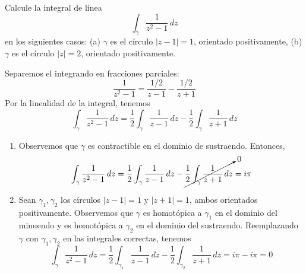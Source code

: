 \begin{exercise}
Calcule la integral de línea
$$\int_\gamma \frac 1 {z^2 - 1} \, dz$$
en los siguientes casos: (a) $\gamma$ es el círculo $|z - 1| = 1$, orientado positivamente, (b) $\gamma$ es el círculo $|z| = 2$, orientado positivamente.
\end{exercise}

\begin{solution}
Separemos el integrando en fracciones parciales:
$$\frac 1 {z^2 - 1} = \frac {1/2} {z-1} - \frac {1/2} {z+1}$$
Por la linealidad de la integral, tenemos
$$\int_\gamma \frac 1 {z^2 - 1} \, dz = \frac 12 \int_\gamma \frac 1 {z-1} \, dz - \frac 12 \int_\gamma \frac 1 {z+1} \, dz$$

\begin{enumerate}[label=(\alph*)]
    \item Observemos que $\gamma$ es contractible en el dominio de sustraendo. Entonces,
    $$\int_\gamma \frac 1 {z^2 - 1} \, dz
        = \frac 12 \int_\gamma \frac 1 {z-1} \, dz - \cancelto 0 {\frac 12 \int_\gamma \frac 1 {z+1} \, dz}
        = i\pi
    $$
    
    \item Sean $\gamma_1, \gamma_2$ los círculos $|z-1| = 1$ y $|z+1| = 1$, ambos orientados positivamente. Observemos que $\gamma$ es homotópica a $\gamma_1$ en el dominio del minuendo y es homotópica a $\gamma_2$ en el dominio del sustraendo. Reemplazando $\gamma$ con $\gamma_1, \gamma_2$ en las integrales correctas, tenemos
    $$\int_\gamma \frac 1 {z^2 - 1} \, dz
        = \frac 12 \int_{\gamma_1} \frac 1 {z-1} \, dz - \frac 12 \int_{\gamma_2} \frac 1 {z+1} \, dz
        = i\pi - i\pi
        = 0
    $$
\end{enumerate}
\end{solution}

